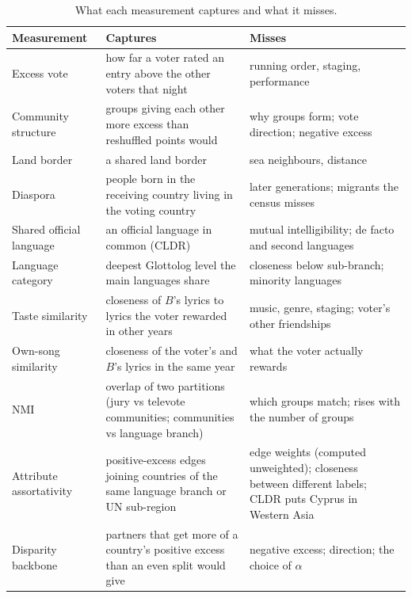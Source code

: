 \begin{table}[t]
\centering
\caption{What each measurement captures and what it misses.}
\label{tab:measures}
\small
\begin{tabular}{p{}p{}p{}}
\hline
Measurement & Captures & Misses \\ \hline
Excess vote & how far a voter rated an entry above the other voters that night & running order, staging, performance \\
Community structure & groups giving each other more excess than reshuffled points would & why groups form; vote direction; negative excess \\
Land border & a shared land border & sea neighbours, distance \\
Diaspora & people born in the receiving country living in the voting country & later generations; migrants the census misses \\
Shared official language & an official language in common (CLDR) & mutual intelligibility; de facto and second languages \\
Language category & deepest Glottolog level the main languages share & closeness below sub-branch; minority languages \\
Taste similarity & closeness of $B$'s lyrics to lyrics the voter rewarded in other years & music, genre, staging; voter's other friendships \\
Own-song similarity & closeness of the voter's and $B$'s lyrics in the same year & what the voter actually rewards \\
NMI & overlap of two partitions (jury vs televote communities; communities vs language branch) & which groups match; rises with the number of groups \\
Attribute assortativity & positive-excess edges joining countries of the same language branch or UN sub-region & edge weights (computed unweighted); closeness between different labels; CLDR puts Cyprus in Western Asia \\
Disparity backbone & partners that get more of a country's positive excess than an even split would give & negative excess; direction; the choice of $\alpha$ \\
\hline
\end{tabular}
\end{table}
